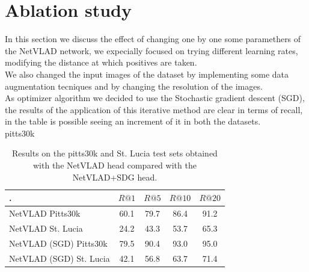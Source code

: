\documentclass[10pt,twocolumn,letterpaper]{article}
\begin{document}
\section{Ablation study}
In this section we discuss the effect of changing one by one some paramethers of the NetVLAD network, we expecially focused on trying different learning rates, modifying the distance at which positives are taken.\\ We also changed the input images of the dataset by implementing some data augmentation tecniques and by changing the resolution of the images.\\
As optimizer algorithm we decided to use the Stochastic gradient descent (SGD), the results of the application of this iterative method are clear in terms of recall, in the table is possible seeing an increment of it in both the datasets.\\
pitts30k
\begin{table}[!h]
	\centering
	\begin{tabular}{|l|c|c|c|c|}
		\hline
		.&        $R@1$   &        $R@5$   &        $R@10$  &        $R@20$   \\ \hline
		NetVLAD  Pitts30k     &         60.1   &         79.7   &          86.4   &          91.2   \\
		NetVLAD St. Lucia        &         24.2   &         43.3   &          53.7   &          65.3   \\ \hline
		NetVLAD (SGD) Pitts30k  &         79.5   &         90.4   &          93.0   &          95.0   \\ 
		NetVLAD (SGD) St. Lucia      &         42.1   & 56.8  &  63.7  &  71.4  \\
		 \hline
	\end{tabular}
	\caption{Results on the pitts30k and St. Lucia test sets obtained with the NetVLAD head compared with the NetVLAD+SDG head.}
	\label{tab:base_results}
\end{table}
\end{document}
